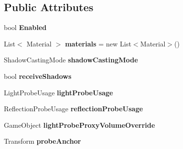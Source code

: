 \subsection*{Public Attributes}
\begin{DoxyCompactItemize}
\item 
\mbox{\label{class_serialize_renderer_1_1_stored_information_a2e6df1181c4de87282435a6aba765661}} 
bool {\bfseries Enabled}
\item 
\mbox{\label{class_serialize_renderer_1_1_stored_information_af5b365bc566d25c57705f856acd1c661}} 
List$<$ Material $>$ {\bfseries materials} = new List$<$Material$>$()
\item 
\mbox{\label{class_serialize_renderer_1_1_stored_information_afbd4ac83383a2cf02b87098c6092e94b}} 
Shadow\+Casting\+Mode {\bfseries shadow\+Casting\+Mode}
\item 
\mbox{\label{class_serialize_renderer_1_1_stored_information_a5e2eaf240db0d8d59eaf20f15a2e0b67}} 
bool {\bfseries receive\+Shadows}
\item 
\mbox{\label{class_serialize_renderer_1_1_stored_information_abcb52c7f8164fc1960646ec2d3c01e52}} 
Light\+Probe\+Usage {\bfseries light\+Probe\+Usage}
\item 
\mbox{\label{class_serialize_renderer_1_1_stored_information_afa342328b7555a7565d9eae3060dfcea}} 
Reflection\+Probe\+Usage {\bfseries reflection\+Probe\+Usage}
\item 
\mbox{\label{class_serialize_renderer_1_1_stored_information_aafe2ddaa55797c0a12c815107aa4401a}} 
Game\+Object {\bfseries light\+Probe\+Proxy\+Volume\+Override}
\item 
\mbox{\label{class_serialize_renderer_1_1_stored_information_a09a914e9a616ca0d814245bc2af9c02a}} 
Transform {\bfseries probe\+Anchor}
\item 

\end{DoxyCompactItemize}
